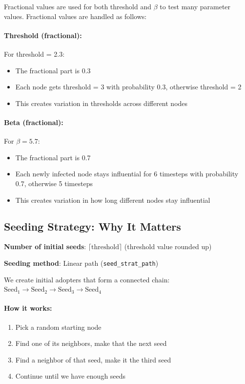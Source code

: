 \documentclass[12pt,a4paper]{article}
\begin{document}
Fractional values are used for both threshold and $\beta$ to test many parameter values. Fractional values are handled as follows:

\paragraph{Threshold (fractional):} For threshold = 2.3:
\begin{itemize}
    \item The fractional part is 0.3
    \item Each node gets threshold = 3 with probability 0.3, otherwise threshold = 2
    \item This creates variation in thresholds across different nodes
\end{itemize}

\paragraph{Beta (fractional):} For $\beta = 5.7$:
\begin{itemize}
    \item The fractional part is 0.7
    \item Each newly infected node stays influential for 6 timesteps with probability 0.7, otherwise 5 timesteps
    \item This creates variation in how long different nodes stay influential
\end{itemize}

\subsection{Seeding Strategy: Why It Matters}

\textbf{Number of initial seeds}: $\lceil \text{threshold} \rceil$ (threshold value rounded up)

\textbf{Seeding method}: Linear path (\texttt{seed\_strat\_path})

We create initial adopters that form a connected chain: $\text{Seed}_1 \to \text{Seed}_2 \to \text{Seed}_3 \to \text{Seed}_4$

\paragraph{How it works:}
\begin{enumerate}
    \item Pick a random starting node
    \item Find one of its neighbors, make that the next seed
    \item Find a neighbor of that seed, make it the third seed
    \item Continue until we have enough seeds
\end{enumerate}
\end{document}
